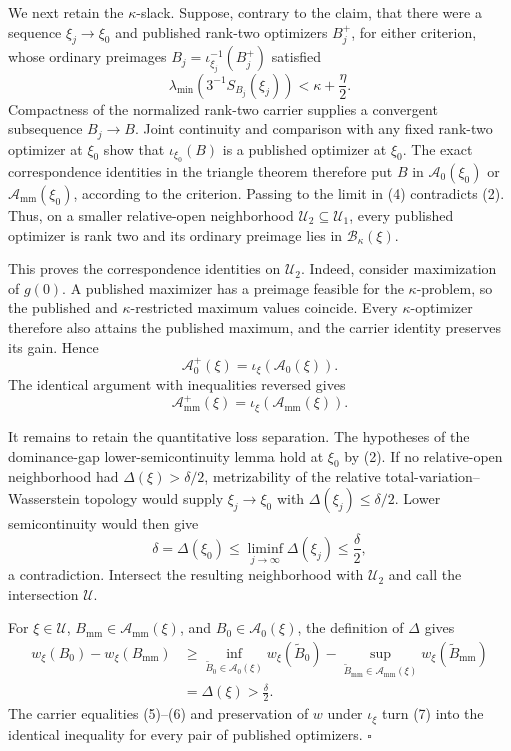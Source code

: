 We next retain the \(\kappa\)-slack.  Suppose, contrary to the claim, that there were a sequence \(\xi_j\to\xi_0\) and published rank-two optimizers \(B_j^+\), for either criterion, whose ordinary preimages \(B_j=\iota_{\xi_j}^{-1}(B_j^+)\) satisfied
\[
\lambda_{\min}\!\left(3^{-1}S_{B_j}(\xi_j)\right)<\kappa+\frac\eta2.
\tag{4}
\]
Compactness of the normalized rank-two carrier supplies a convergent subsequence \(B_j\to B\).  Joint continuity and comparison with any fixed rank-two optimizer at \(\xi_0\) show that \(\iota_{\xi_0}(B)\) is a published optimizer at \(\xi_0\).  The exact correspondence identities in the triangle theorem therefore put \(B\) in \(\mathcal A_0(\xi_0)\) or \(\mathcal A_{\mathrm{mm}}(\xi_0)\), according to the criterion.  Passing to the limit in (4) contradicts (2).  Thus, on a smaller relative-open neighborhood \(\mathcal U_2\subseteq\mathcal U_1\), every published optimizer is rank two and its ordinary preimage lies in \(\mathcal B_\kappa(\xi)\).

This proves the correspondence identities on \(\mathcal U_2\).  Indeed, consider maximization of \(g(0)\).  A published maximizer has a preimage feasible for the \(\kappa\)-problem, so the published and \(\kappa\)-restricted maximum values coincide.  Every \(\kappa\)-optimizer therefore also attains the published maximum, and the carrier identity preserves its gain.  Hence
\[
\mathcal A_0^+(\xi)=\iota_\xi\!\left(\mathcal A_0(\xi)\right).
\tag{5}
\]
The identical argument with inequalities reversed gives
\[
\mathcal A_{\mathrm{mm}}^+(\xi)
=\iota_\xi\!\left(\mathcal A_{\mathrm{mm}}(\xi)\right).
\tag{6}
\]

It remains to retain the quantitative loss separation.  The hypotheses of the dominance-gap lower-semicontinuity lemma hold at \(\xi_0\) by (2).  If no relative-open neighborhood had \(\Delta(\xi)>\delta/2\), metrizability of the relative total-variation--Wasserstein topology would supply \(\xi_j\to\xi_0\) with \(\Delta(\xi_j)\le\delta/2\).  Lower semicontinuity would then give
\[
\delta=\Delta(\xi_0)
\le\liminf_{j\to\infty}\Delta(\xi_j)
\le\frac\delta2,
\]
a contradiction.  Intersect the resulting neighborhood with \(\mathcal U_2\) and call the intersection \(\mathcal U\).

For \(\xi\in\mathcal U\), \(B_{\mathrm{mm}}\in\mathcal A_{\mathrm{mm}}(\xi)\), and \(B_0\in\mathcal A_0(\xi)\), the definition of \(\Delta\) gives
\[
\begin{split}
w_\xi(B_0)-w_\xi(B_{\mathrm{mm}})
&\ge
\inf_{\widetilde B_0\in\mathcal A_0(\xi)}w_\xi(\widetilde B_0)
-\sup_{\widetilde B_{\mathrm{mm}}\in\mathcal A_{\mathrm{mm}}(\xi)}
w_\xi(\widetilde B_{\mathrm{mm}})\\
&=\Delta(\xi)>\frac\delta2.
\end{split}
\tag{7}
\]
The carrier equalities (5)--(6) and preservation of \(w\) under \(\iota_\xi\) turn (7) into the identical inequality for every pair of published optimizers. \(\square\)